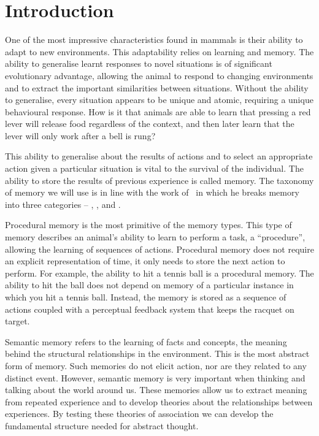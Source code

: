 \chapter{Introduction}
\label{chap:intro}

One of the most impressive characteristics found in mammals is their ability to adapt to new environments.  This adaptability relies on learning and memory.  The ability to generalise learnt responses to novel situations is of significant evolutionary advantage, allowing the animal to respond to changing environments and to extract the important similarities between situations.   Without the ability to generalise, every situation appears to be unique and atomic, requiring a unique behavioural response.  How is it that animals are able to learn that pressing a red lever will release food regardless of the context, and then later learn that the lever will only work after a bell is rung?

This ability to generalise about the results of actions and to select an appropriate action given a particular situation is vital to the survival of the individual.  The ability to store the results of previous experience is called memory.  The taxonomy of memory we will use is in line with the work of~\citet{Tulving1987} in which he breaks memory into three categories -- , , and .

Procedural memory is the most primitive of the memory types.  This type of memory describes an animal's ability to learn to perform a task, a ``procedure'', allowing the learning of sequences of actions.  Procedural memory does not require an explicit representation of time, it only needs to store the next action to perform.   For example, the ability to hit a tennis ball is a procedural memory.  The ability to hit the ball does not depend on memory of a particular instance in which you hit a tennis ball.  Instead, the memory is stored as a sequence of actions coupled with a perceptual feedback system that keeps the racquet on target. 
   
Semantic memory refers to the learning of facts and concepts, the meaning behind the structural relationships in the environment.  This is the most abstract form of memory.  Such memories do not elicit action, nor are they related to any distinct event.  However, semantic memory is very important when thinking and talking about the world around us.  These memories allow us to extract meaning from repeated experience and to develop theories about the relationships between experiences.  By testing these theories of association we can develop the fundamental structure needed for abstract thought.
 
